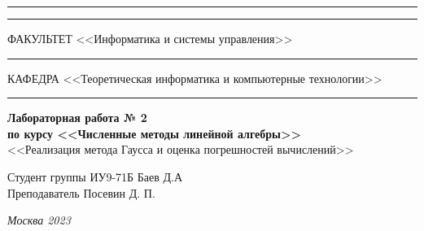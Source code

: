 \documentclass[a4paper, 14pt]{extarticle}
\begin{document}
\begin{titlepage}
\vspace{-25pt}
\hspace{-35pt}\rule{\textwidth}{2.3pt}

\vspace*{-20.3pt}
\hspace{-35pt}\rule{\textwidth}{0.4pt}

\vspace{1.5ex}
\hspace{-35pt} \noindent \small ФАКУЛЬТЕТ\hspace{80pt} <<Информатика и системы управления>>

\vspace*{-16pt}
\hspace{47pt}\rule{0.83\textwidth}{0.4pt}

\vspace{0.5ex}
\hspace{-35pt} \noindent \small КАФЕДРА\hspace{50pt} <<Теоретическая информатика и компьютерные технологии>>

\vspace*{-16pt}
\hspace{30pt}\rule{0.866\textwidth}{0.4pt}

\vspace{11em}

\begin{center}
\Large {\bf Лабораторная работа № 2 } \\
\large {\bf по курсу <<Численные методы линейной алгебры>>} \\
\large <<Реализация метода Гаусса и оценка погрешностей
вычислений>>
\end{center}\normalsize

\vspace{8em}


\begin{flushright}
  {Студент группы ИУ9-71Б Баев Д.А \hspace*{15pt}\\
  \vspace{2ex}
  Преподаватель Посевин Д. П.\hspace*{15pt}}
\end{flushright}

\bigskip

\vfill


\begin{center}
\textsl{Москва 2023}
\end{center}
\end{titlepage}
\end{document}
